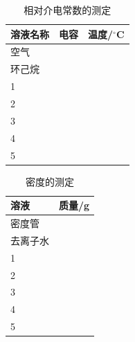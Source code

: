 \documentclass[a4paper]{article}
\begin{document}
\begin{table}[H]
	\caption{相对介电常数的测定}
	\begin{center}
		\begin{tabular}{l|l|l}
			\hline
			溶液名称&	电容\quad\quad\quad\quad\quad	 &温度/$^\circ$C\\
			\hline
			空气	&		   	&	\\
			\hline
			环己烷	&		    &	\\
			\hline
			1		&		   	&	\\
			\hline
			2		&		   	&	\\
			\hline
			3		&		   	&	\\
			\hline
			4		&		   	&	\\
			\hline
			5		&		   	&	\\
			\hline
		\end{tabular}
	\end{center}
\end{table}

\begin{table}[H]
	\caption{密度的测定}
	\begin{center}
		\begin{tabular}{l|l}
			\hline
			溶液 & 质量/g\quad\quad\quad\quad\quad \\
			\hline
			密度管 &	\\
			\hline
			去离子水&	\\
			\hline
			1	&	\\
			\hline
			2	&	\\
			\hline
			3	&	\\
			\hline
			4	&	\\
			\hline
			5	&	\\
			\hline
		\end{tabular}
	\end{center}
\end{table}
\end{document}
